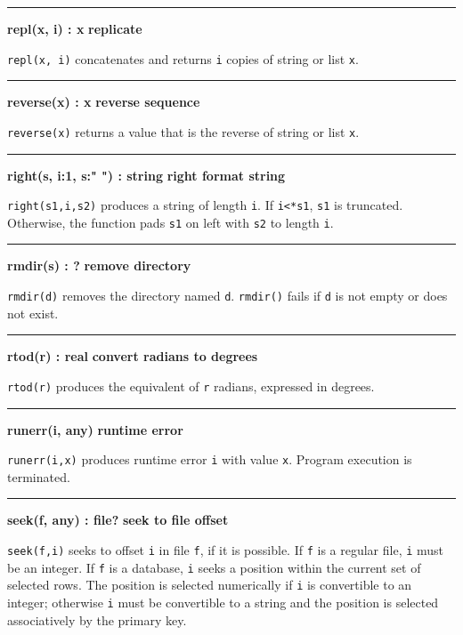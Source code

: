 \bigskip\hrule\vspace{0.1cm}
\noindent
{\bf repl(x, i) : x } \hfill {\bf replicate}

\noindent
{}\texttt{repl(x, i)} concatenates and returns
\texttt{i} copies of string or list \texttt{x}.

\bigskip\hrule\vspace{0.1cm}
\noindent
{\bf reverse(x) : x } \hfill {\bf reverse sequence}

\noindent
{}\texttt{reverse(x)} returns a value that is the
reverse of string or list \texttt{x}.

\bigskip\hrule\vspace{0.1cm}
\noindent
{\bf right(s, i:1, s:" ") : string } \hfill {\bf right format string}

\noindent
{}\texttt{right(s1,i,s2)} produces a string of length
\texttt{i}. If \texttt{i{\textless}*s1}, \texttt{s1} is truncated.
Otherwise, the function pads \texttt{s1} on left with \texttt{s2} to
length \texttt{i}.

\bigskip\hrule\vspace{0.1cm}
\noindent
{\bf rmdir(s) : ? } \hfill {\bf remove directory}

\noindent
{}\texttt{rmdir(d)} removes the directory named
\texttt{d}. \texttt{rmdir()} fails if \texttt{d} is not empty or does
not exist.

\bigskip\hrule\vspace{0.1cm}
\noindent
{\bf rtod(r) : real } \hfill {\bf convert radians to degrees}

\noindent
{}\texttt{rtod(r)} produces the
equivalent of \texttt{r} radians, expressed in degrees.

\bigskip\hrule\vspace{0.1cm}
\noindent
{\bf runerr(i, any) } \hfill {\bf runtime error}

\noindent
{}\texttt{runerr(i,x)} produces runtime error
\texttt{i} with value \texttt{x}. Program execution is terminated.

\bigskip\hrule\vspace{0.1cm}
\noindent
{\bf seek(f, any) : file? } \hfill {\bf seek to file offset}

\noindent
{}\texttt{seek(f,i)} seeks to offset \texttt{i} in file
\texttt{f}, if it is possible. If \texttt{f} is a regular file,
\texttt{i} must be an integer. If \texttt{f} is a database, \texttt{i}
seeks a position within the current set of selected rows. The position
is selected numerically if \texttt{i} is convertible to an integer;
otherwise \texttt{i} must be convertible to a string and the position
is selected associatively by the primary key.

